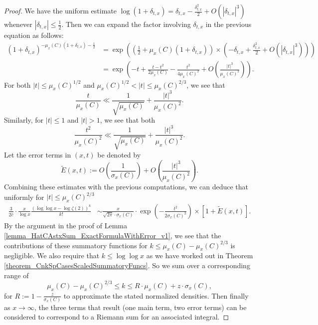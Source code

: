 \documentclass[11pt,reqno,a4letter]{article}
\numberwithin{figure}{section}
\numberwithin{table}{section}
\theoremstyle{plain}
\numberwithin{theorem}{section}
\theoremstyle{definition}
\begin{document}
\begin{proof}
We have the uniform estimate 
$\log(1+\delta_{t,x}) = \delta_{t,x} - \frac{\delta_{t,x}^2}{2} + O(|\delta_{t,x}|^3)$ whenever 
$|\delta_{t,x}| \leq \frac{1}{2}$. Then we can expand the factor involving $\delta_{t,x}$ 
in the previous equation as follows: 
\begin{align*} 
(1+\delta_{t,x})^{-\mu_x(C) (1+\delta_{t,x}) - \frac{1}{2}} & = 
     \exp\left(\left(\frac{1}{2}+\mu_x(C) (1+\delta_{t,x})\right) \times 
     \left(-\delta_{t,x} + \frac{\delta_{t,x}^2}{2} + O(|\delta_{t,x}|^3)\right)\right) \\ 
     & = \exp\left(-t + \frac{t-t^2}{2\mu_x(C)} - \frac{t^2}{4\mu_x(C)^2} + 
     O\left(\frac{|t|^3}{\mu_x(C)^2}\right)\right). 
\end{align*} 
For both $|t| \leq \mu_x(C)^{1/2}$ and 
$\mu_x(C)^{1/2} < |t| \leq \mu_x(C)^{2/3}$, 
we see that 
\[
\frac{t}{\mu_x(C)} \ll \frac{1}{\sqrt{\mu_x(C)}} + \frac{|t|^3}{\mu_x(C)^2}. 
\]
Similarly, for $|t| \leq 1$ and $|t| > 1$, we see that both 
\[
\frac{t^2}{\mu_x(C)^2} \ll \frac{1}{\sqrt{\mu_x(C)}} + 
     \frac{|t|^3}{\mu_x(C)^2}. 
\] 
Let the error terms in $(x, t)$ be denoted by 
\[
\widetilde{E}(x, t) := O\left(\frac{1}{\sigma_x(C)}\right) + 
     O\left(\frac{|t|^3}{\mu_x(C)^2}\right). 
\]
Combining these estimates with the previous computations, we can deduce that 
uniformly for $|t| \leq \mu_x(C)^{2/3}$ 
\begin{align*} 
\frac{3}{2\hat{c}} \cdot \frac{x}{\log x} \frac{(\log\log x - \log\zeta(2))^{k}}{k!} & \sim 
     \frac{x}{\sqrt{2\pi} \cdot \sigma_x(C)} 
     \cdot \exp\left(-\frac{t^2}{2\sigma_x(C)^2}\right) \times 
     \left[1 + \widetilde{E}(x, t)\right]. 
\end{align*} 
By the argument in the proof of 
Lemma \ref{lemma_HatCAstxSum_ExactFormulaWithError_v1}, we see that 
the contributions of these summatory functions for 
$k \leq \mu_x(C) - \mu_x(C)^{2/3}$ is negligible. 
We also require that $k \leq \log\log x$ as we have worked out in 
Theorem \ref{theorem_CnkSpCasesScaledSummatoryFuncs}. So we sum over a 
corresponding range of 
\[
\mu_x(C) -\mu_x(C)^{2/3} \leq k \leq R \cdot \mu_x(C) + z \cdot \sigma_x(C), 
\] 
for $R := 1 - \frac{z}{\sigma_x(C)}$ to approximate the 
stated normalized densities. 
Then finally as $x \rightarrow \infty$, the 
three terms that result (one main term, two error terms) 
can be considered to correspond to a Riemann sum for an associated integral. 
\end{proof} 
\end{document}
